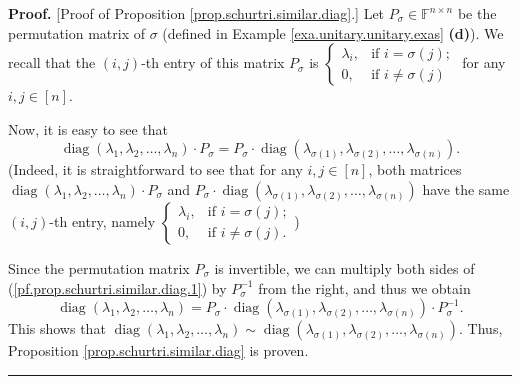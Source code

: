 \documentclass[numbers=enddot,12pt,final,onecolumn,notitlepage]{scrartcl}%
\numberwithin{exer}{subsection}
\theoremstyle{definition}
\newenvironment{proof}[1][Proof]{\noindent\textbf{#1.} }{\ \rule{0.5em}{0.5em}}
\begin{document}
\begin{proof}
[Proof of Proposition \ref{prop.schurtri.similar.diag}.] Let $P_{\sigma}%
\in\mathbb{F}^{n\times n}$ be the permutation matrix of $\sigma$ (defined in
Example \ref{exa.unitary.unitary.exas} \textbf{(d)}). We recall that the
$\left(  i,j\right)  $-th entry of this matrix $P_{\sigma}$ is $%
\begin{cases}
\lambda_{i}, & \text{if }i=\sigma\left(  j\right)  ;\\
0, & \text{if }i\neq\sigma\left(  j\right)
\end{cases}
$ for any $i,j\in\left[  n\right]  $.

Now, it is easy to see that%
\begin{equation}
\operatorname*{diag}\left(  \lambda_{1},\lambda_{2},\ldots,\lambda_{n}\right)
\cdot P_{\sigma}=P_{\sigma}\cdot\operatorname*{diag}\left(  \lambda
_{\sigma\left(  1\right)  },\lambda_{\sigma\left(  2\right)  },\ldots
,\lambda_{\sigma\left(  n\right)  }\right)
.\label{pf.prop.schurtri.similar.diag.1}%
\end{equation}
(Indeed, it is straightforward to see that for any $i,j\in\left[  n\right]  $,
both matrices $\operatorname*{diag}\left(  \lambda_{1},\lambda_{2}%
,\ldots,\lambda_{n}\right)  \cdot P_{\sigma}$ and $P_{\sigma}\cdot
\operatorname*{diag}\left(  \lambda_{\sigma\left(  1\right)  },\lambda
_{\sigma\left(  2\right)  },\ldots,\lambda_{\sigma\left(  n\right)  }\right)
$ have the same $\left(  i,j\right)  $-th entry, namely $%
\begin{cases}
\lambda_{i}, & \text{if }i=\sigma\left(  j\right)  ;\\
0, & \text{if }i\neq\sigma\left(  j\right)  .
\end{cases}
$)

Since the permutation matrix $P_{\sigma}$ is invertible, we can multiply both
sides of (\ref{pf.prop.schurtri.similar.diag.1}) by $P_{\sigma}^{-1}$ from the
right, and thus we obtain
\[
\operatorname*{diag}\left(  \lambda_{1},\lambda_{2},\ldots,\lambda_{n}\right)
=P_{\sigma}\cdot\operatorname*{diag}\left(  \lambda_{\sigma\left(  1\right)
},\lambda_{\sigma\left(  2\right)  },\ldots,\lambda_{\sigma\left(  n\right)
}\right)  \cdot P_{\sigma}^{-1}.
\]
This shows that $\operatorname*{diag}\left(  \lambda_{1},\lambda_{2}%
,\ldots,\lambda_{n}\right)  \sim\operatorname*{diag}\left(  \lambda
_{\sigma\left(  1\right)  },\lambda_{\sigma\left(  2\right)  },\ldots
,\lambda_{\sigma\left(  n\right)  }\right)  $. Thus, Proposition
\ref{prop.schurtri.similar.diag} is proven.
\end{proof}
\end{document}
